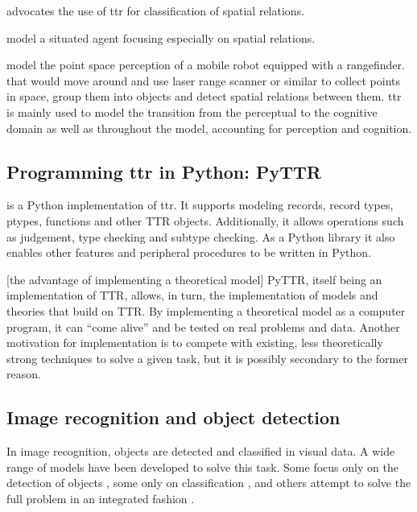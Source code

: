 \cite{DobnikModellinglanguageaction2012} advocates the use of \gls{ttr} for classification of spatial relations.

\cite{ttrspat} model a situated agent 
 focusing especially on spatial relations.

\cite{lspc} model the point space perception of a mobile robot equipped with a rangefinder.
 that would move around and use laser range scanner or similar to collect points in space, group them into objects and detect spatial relations between them.
\Gls{ttr} is mainly used to model the transition from the perceptual to the cognitive domain as well as 
 throughout the model, accounting for perception and cognition.


\cite{LarssonFormalsemanticsperceptual2015}



\subsection{Programming \acrshort{ttr} in Python: PyTTR}

\cite{pyttr} is a Python implementation of \gls{ttr}.
It supports modeling records, record types, ptypes, functions and other TTR objects.
Additionally, it allows operations such as judgement, type checking and subtype checking.
As a Python library it also enables other features and peripheral procedures to be written in Python.

[the advantage of implementing a theoretical model]
PyTTR, itself being an implementation of TTR, allows, in turn, the implementation of models and theories that build on TTR.
By implementing a theoretical model as a computer program, it can ``come alive'' and be tested on real problems and data.
Another motivation for implementation is to compete with existing, less theoretically strong techniques to solve a given task, but it is possibly secondary to the former reason.




\subsection{Image recognition and object detection}

In image recognition, objects are detected and classified in visual data.
A wide range of models have been developed to solve this task.
Some focus only on the detection of objects \citep{BlaschkoLearningLocalizeObjects2008}, some only on classification \citep[ResNet,][]{HeDeepResidualLearning2015}, and others attempt to solve the full problem in an integrated fashion \citep{RedmonYouOnlyLook2015,HeMaskRCNN2017}.

